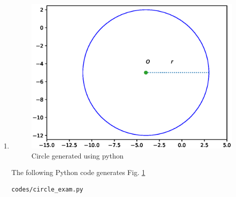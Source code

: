 \begin{enumerate}[label=\thesubsection.\arabic*.,ref=\thesubsection.\theenumi]
\item 
\begin{figure}[!ht]
\centering
\includegraphics[width=\columnwidth]{./figs/circle_examp/circle.eps}
\caption{Circle generated using python}
\label{fig:circle2_circle_examp}
\end{figure} 

The following Python code generates Fig. \ref{fig:circle2_circle_examp}

\begin{lstlisting}
codes/circle_exam.py
\end{lstlisting}

\end{enumerate}